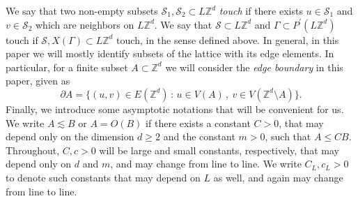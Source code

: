 \documentclass[11pt]{article}
\theoremstyle{definition}
\theoremstyle{remark}
\numberwithin{theorem}{section}
\def\Ga{{\Gamma}}
\newcommand{\bZ}{\mathbb Z}
\begin{document}
    We say that two non-empty subsets $\mathcal{S}_1,\mathcal{S}_2\subset L\bZ^d$ \emph{touch} if there exists $u\in \mathcal{S}_1$ and $v\in \mathcal{S}_2$ which are neighbors on $L\bZ^d$. We say that $\mathcal{S}\subset L\bZ^d$ and $\Ga\subset P^\prime(L\bZ^d)$ touch if $\mathcal{S}, X(\Ga)\subset L\bZ^d$ touch, in the sense defined above. In general, in this paper we will mostly identify subsets of the lattice with its edge elements. In particular, for a finite subset $A\subset \bZ^d$ we will consider the \emph{edge boundary} in this paper, given as
    \[
    \partial A = \big\{ (u,v)\in E(\bZ^d) \, : \, u\in V(A) \, , \ v\in V(\bZ^d\setminus A) \big\}.
    \]
    Finally, we introduce some asymptotic notations that will be convenient for us. We write $A\lesssim B$ or $A = O(B)$ if there exists a constant $C>0$, that may depend only on the dimension $d\ge 2$ and the constant $m>0$, such that $A \le C B$. Throughout, $C,c>0$ will be large and small constants, respectively, that may depend only on $d$ and $m$, and may change from line to line. We write $C_L,c_L>0$ to denote such constants that may depend on $L$ as well, and again may change from line to line. 
   
\end{document}
